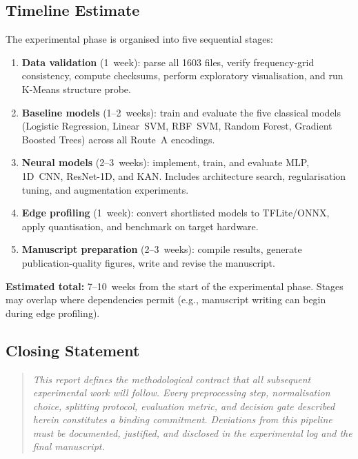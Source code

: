 \subsection{Timeline Estimate}
\label{subsec:timeline}

The experimental phase is organised into five sequential stages:

\begin{enumerate}
  \item \textbf{Data validation} (1~week): parse all \num{1603} files,
        verify frequency-grid consistency, compute checksums, perform
        exploratory visualisation, and run K-Means structure probe.
  \item \textbf{Baseline models} (1--2~weeks): train and evaluate the
        five classical models (Logistic Regression, Linear~SVM,
        RBF~SVM, Random Forest, Gradient Boosted Trees) across all
        Route~A encodings.
  \item \textbf{Neural models} (2--3~weeks): implement, train, and
        evaluate MLP, 1D~CNN, ResNet-1D, and KAN.  Includes
        architecture search, regularisation tuning, and augmentation
        experiments.
  \item \textbf{Edge profiling} (1~week): convert shortlisted models
        to TFLite/ONNX, apply quantisation, and benchmark on target
        hardware.
  \item \textbf{Manuscript preparation} (2--3~weeks): compile results,
        generate publication-quality figures, write and revise the
        manuscript.
\end{enumerate}

\noindent
\textbf{Estimated total:} 7--10~weeks from the start of the
experimental phase.  Stages may overlap where dependencies permit
(e.g., manuscript writing can begin during edge profiling).


\subsection{Closing Statement}
\label{subsec:closing}

\begin{quote}
\itshape
This report defines the methodological contract that all subsequent
experimental work will follow.  Every preprocessing step, normalisation
choice, splitting protocol, evaluation metric, and decision gate
described herein constitutes a binding commitment.  Deviations from
this pipeline must be documented, justified, and disclosed in the
experimental log and the final manuscript.
\end{quote}
